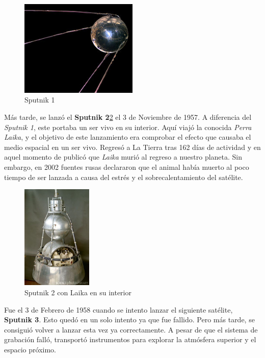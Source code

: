 \begin{figure}[H]
\begin{center}
  \includegraphics[width=0.5\textwidth]{./EtapaPrimeriza/imagenes/s1.jpg}
  \caption{Sputnik 1}
  \label{s1}
\end{center}
\end{figure}

Más tarde, se lanzó el \textbf{Sputnik 2}\ref{s2} el 3 de Noviembre de 1957. A diferencia del \textit{Sputnik 1}, este portaba un ser vivo en su interior. Aquí viajó la conocida \textit{Perra Laika}, y el objetivo de este lanzamiento era comprobar el efecto que causaba el medio espacial en un ser vivo. Regresó a La Tierra tras 162 días de actividad y en aquel momento de publicó que \textit{Laika} murió al regreso a nuestro planeta. Sin embargo, en 2002 fuentes rusas declararon que el animal había muerto al poco tiempo de ser lanzada a causa del estrés y el sobrecalentamiento del satélite.\\

\begin{figure}[H]
\begin{center}
  \includegraphics[width=0.3\textwidth]{./EtapaPrimeriza/imagenes/s2.jpg}
  \caption{Sputnik 2 con Laika en su interior}
  \label{s2}
\end{center}
\end{figure}

Fue el 3 de Febrero de 1958 cuando se intento lanzar el siguiente satélite, \textbf{Sputnik 3}. Esto quedó en un solo intento ya que fue fallido. Pero más tarde, se consiguió volver a lanzar esta vez ya correctamente. A pesar de que el sistema de grabación falló, transportó instrumentos para explorar la atmósfera superior y el espacio próximo.\\

